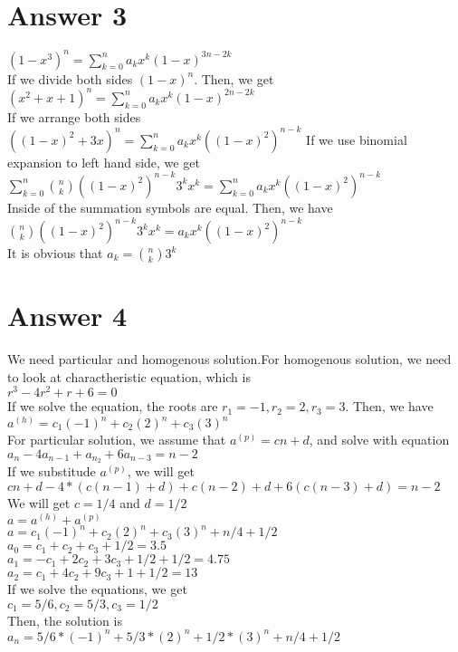 \documentclass[12pt]{article}
\begin{document}
\section*{Answer 3}
$(1-x^3)^n = \sum_{k=0}^na_kx^k(1-x)^{3n-2k}$ \\
If we divide both sides $(1-x)^n$. Then, we get \\
$(x^2+x+1)^n = \sum_{k=0}^na_kx^k(1-x)^{2n-2k}$ \\
If we arrange both sides \\
$((1-x)^2 + 3x)^n = \sum_{k=0}^na_kx^k((1-x)^2)^{n-k}$
If we use binomial expansion to left hand side, we get\\
$\sum_{k=0}^n\binom{n}{k}((1-x)^2)^{n-k}3^kx^k = \sum_{k=0}^na_kx^k((1-x)^2)^{n-k}$ \\
Inside of the summation symbols are equal. Then, we have \\
$\binom{n}{k}((1-x)^2)^{n-k}3^kx^k = a_kx^k((1-x)^2)^{n-k}$ \\
It is obvious that $a_k = \binom{n}{k}3^k$ \\


\section*{Answer 4}
We need particular and homogenous solution.For homogenous solution, we need to look at charactheristic equation, which is \\
$r^3-4r^2+r+6 = 0$ \\
If we solve the equation, the roots are $r_1 = -1, r_2 = 2, r_3 = 3$. Then, we have \\
$a^{(h)} = c_1(-1)^n+c_2(2)^n+c_3(3)^n$ \\
For particular solution, we assume that $a^{(p)} = cn + d$, and solve with equation $a_n - 4a_{n-1} + a_{n_2} + 6a_{n-3} = n- 2$ \\
If we substitude $a^{(p)}$, we will get \\
$cn+d - 4*(c(n-1)+d) + c(n-2) + d + 6(c(n-3) + d) = n-2$ \\
We will get $c = 1/4$ and $d = 1/2$ \\
$a = a^{(h)} + a^{(p)}$ \\
$a = c_1(-1)^n + c_2(2)^n + c_3(3)^n + n/4 + 1/2$ \\
$a_0 = c_1 + c_2 + c_3  + 1/2 = 3.5$ \\
$a_1 = -c_1 + 2c_2 + 3c_3 + 1/2+ 1/2 = 4.75$ \\
$a_2 = c_1 + 4c_2 + 9c_3+1+1/2 = 13$ \\
If we solve the equations, we get \\
$c_1 = 5/6 , c_2 = 5/3, c_3 = 1/2$ \\
Then, the solution is \\
$a_n = 5/6 * (-1)^n + 5/3*(2)^n + 1/2*(3)^n + n/4 + 1/2$ \\
\end{document}
